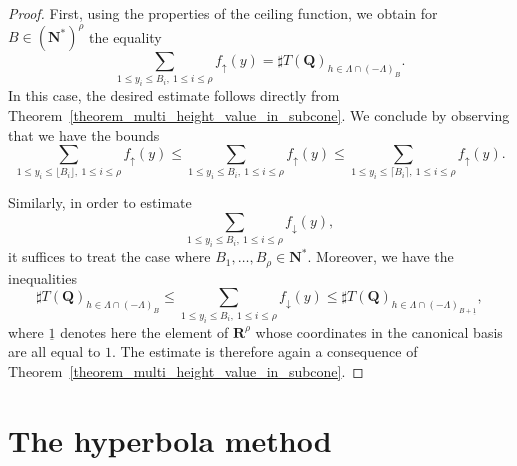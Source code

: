 \documentclass{proc-l}
\newcommand{\R}{\mathbf{R}}
\newcommand{\N}{\mathbf{N}}
\newcommand{\Q}{\mathbf{Q}}
\theoremstyle{definition}
\theoremstyle{remark}
\numberwithin{equation}{section}
\begin{document}
\begin{proof}
First, using the properties of the ceiling function, we obtain for
\(B \in (\N^{*})^{\rho}\) the equality
\[
\sum_{1 \leqslant y_i \leqslant B_i,\ 1 \leqslant i \leqslant \rho}
f_{\uparrow}(y)
=
\sharp T(\Q)_{h \in \Lambda \cap (-\Lambda)_B }.
\]
In this case, the desired estimate follows directly from
Theorem~\ref{theorem_multi_height_value_in_subcone}.
We conclude by observing that we have the bounds
\[
\sum_{1 \leqslant y_i \leqslant \lfloor B_i \rfloor,\ 1 \leqslant i \leqslant \rho}
f_{\uparrow}(y)
\leqslant
\sum_{1 \leqslant y_i \leqslant B_i,\ 1 \leqslant i \leqslant \rho}
f_{\uparrow}(y)
\leqslant
\sum_{1 \leqslant y_i \leqslant \lceil B_i \rceil,\ 1 \leqslant i \leqslant \rho}
f_{\uparrow}(y).
\]

Similarly, in order to estimate
\[
\sum_{1 \leqslant y_i \leqslant B_i,\ 1 \leqslant i \leqslant \rho}
f_{\downarrow}(y),
\]
it suffices to treat the case where \(B_1, \dots, B_{\rho} \in \N^*\).
Moreover, we have the inequalities
\[
\sharp T(\Q)_{h \in\Lambda \cap (-\Lambda)_B}
\leqslant
\sum_{1 \leqslant y_i \leqslant B_i,\ 1 \leqslant i \leqslant \rho}
f_{\downarrow}(y)
\leqslant
\sharp T(\Q)_{h \in \Lambda \cap (-\Lambda)_{B+ \underline{1} }},
\]
where \(\underline{1}\) denotes here the element of \(\R^{\rho}\) whose coordinates in the
canonical basis are all equal to \(1\).
The estimate is therefore again a consequence of
Theorem~\ref{theorem_multi_height_value_in_subcone}.
\end{proof}






\section{The hyperbola method}
\end{document}
